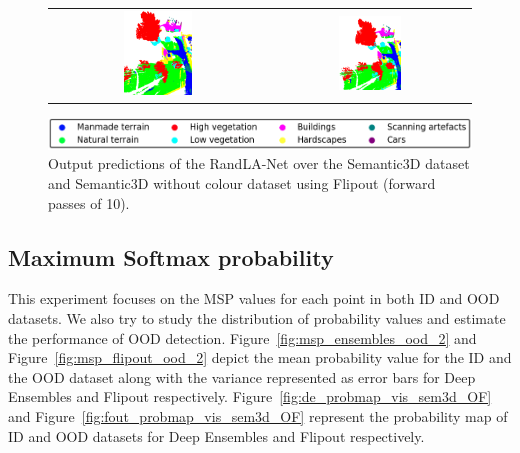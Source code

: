 \begin{figure}[h!]
\begin{tabular}{cc}
            \includegraphics[width=0.33\textwidth, height=0.18\textheight]{images/ood_imgs/fout_sem3d/fout_3.pdf}&
            \includegraphics[width=0.33\textwidth, height=0.18\textheight]{images/sem3d_of/fout_sem3d_of_3.pdf}\\
        \end{tabular}
        \includegraphics[scale=0.45]{images/legend.png}
        \caption{Output predictions of the RandLA-Net over the Semantic3D dataset and Semantic3D without colour
        dataset using Flipout (forward passes of 10).}
        \label{fig:flipout_vis_sem3d_OF}
    \end{figure}   
    \FloatBarrier


    \subsection{Maximum Softmax probability}
    This experiment focuses on the MSP values for each point in both ID and OOD datasets.
    We also try to study the distribution of probability values and estimate the performance of OOD detection.
    Figure~\ref{fig:msp_ensembles_ood_2} and Figure~\ref{fig:msp_flipout_ood_2} depict the mean probability value for the ID and the OOD dataset along with the variance represented as error bars for Deep Ensembles and Flipout respectively.
    Figure~\ref{fig:de_probmap_vis_sem3d_OF} and Figure~\ref{fig:fout_probmap_vis_sem3d_OF} represent the probability map of ID and OOD datasets for Deep Ensembles and Flipout respectively.

